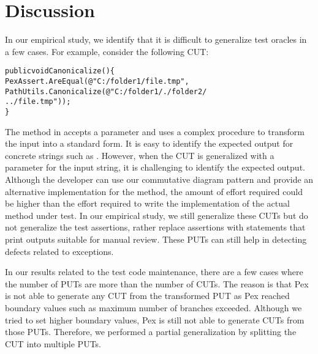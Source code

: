 \section{Discussion} 
\label{sec:limitations}

In our empirical study, we identify that it is difficult to generalize test oracles in a few cases. For example, consider the following CUT:\vspace*{-1ex}

\begin{CodeOut}
\begin{alltt}
public void Canonicalize() \{
\hspace*{0.1in}PexAssert.AreEqual(@"C:/folder1/file.tmp",
\hspace*{0.3in}PathUtils.Canonicalize(@"C:/folder1/./folder2/
\hspace*{0.3in}../file.tmp")); 
\}
\end{alltt}
\end{CodeOut}

The  method in  accepts a  parameter and uses a complex procedure to transform the input into a standard form. It is easy to identify the expected output for concrete strings such as . However, when the CUT is generalized with a parameter for the input string, it is challenging to identify the expected output. Although the developer can use our commutative diagram pattern and provide an alternative implementation for the  method, the amount of effort required could be higher than the effort required to write the implementation of the actual method under test. In our empirical study, we still generalize these CUTs but do not generalize the test assertions, rather replace assertions with statements that print outputs suitable for manual review. These PUTs can still help in detecting defects related to exceptions.

In our results related to the test code maintenance, there are a few cases where the number of PUTs are more than the number of CUTs. The reason is that Pex is not able to generate any CUT from the transformed PUT as Pex reached boundary values such as maximum number of branches exceeded. Although we tried to set higher boundary values, Pex is still not able to generate CUTs from those PUTs. Therefore, we performed a partial generalization by splitting the CUT into multiple PUTs.

